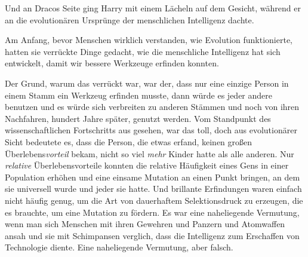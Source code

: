 \later

Und an Dracos Seite ging Harry mit einem Lächeln auf dem Gesicht, während er an die evolutionären Ursprünge der menschlichen Intelligenz dachte.

Am Anfang, bevor Menschen wirklich verstanden, wie Evolution funktionierte, hatten sie verrückte Dinge gedacht, wie die menschliche Intelligenz hat sich entwickelt, damit wir bessere Werkzeuge erfinden konnten.

Der Grund, warum das verrückt war, war der, dass nur eine einzige Person in einem Stamm ein Werkzeug erfinden musste, dann würde es jeder andere benutzen und es würde sich verbreiten zu anderen Stämmen und noch von ihren Nachfahren, hundert Jahre später, genutzt werden. Vom Standpunkt des wissenschaftlichen Fortschritts aus gesehen, war das toll, doch aus evolutionärer Sicht bedeutete es, dass die Person, die etwas erfand, keinen großen Überlebens\emph{vorteil} bekam, nicht so viel \emph{mehr} Kinder hatte als alle anderen. Nur \emph{relative} Überlebensvorteile konnten die relative Häufigkeit eines Gens in einer Population erhöhen und eine einsame Mutation an einen Punkt bringen, an dem sie universell wurde und jeder sie hatte. Und brillante Erfindungen waren einfach nicht häufig genug, um die Art von dauerhaftem Selektionsdruck zu erzeugen, die es brauchte, um eine Mutation zu fördern. Es war eine naheliegende Vermutung, wenn man sich Menschen mit ihren Gewehren und Panzern und Atomwaffen ansah und sie mit Schimpansen verglich, dass die Intelligenz zum Erschaffen von Technologie diente. Eine naheliegende Vermutung, aber falsch.

